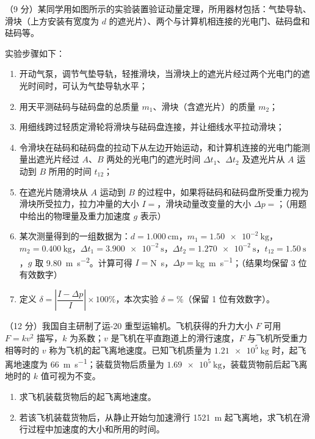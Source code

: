 \begin{question}
（9 分）某同学用如图所示的实验装置验证动量定理，所用器材包括：气垫导轨、滑块（上方安装有宽度为 $d$ 的遮光片）、两个与计算机相连接的光电门、砝码盘和砝码等。


实验步骤如下：
\begin{enumerate}[leftmargin=2em, label=(\arabic*)]
  \item 开动气泵，调节气垫导轨，轻推滑块，当滑块上的遮光片经过两个光电门的遮光时间\gkblank{}时，可认为气垫导轨水平；
  \item 用天平测砝码与砝码盘的总质量 $m_1$、滑块（含遮光片）的质量 $m_2$；
  \item 用细线跨过轻质定滑轮将滑块与砝码盘连接，并让细线水平拉动滑块；
  \item 令滑块在砝码和砝码盘的拉动下从左边开始运动，和计算机连接的光电门能测量出遮光片经过 $A$、$B$ 两处的光电门的遮光时间 $\Delta t_1$、$\Delta t_2$ 及遮光片从 $A$ 运动到 $B$ 所用的时间 $t_{12}$；
  \item 在遮光片随滑块从 $A$ 运动到 $B$ 的过程中，如果将砝码和砝码盘所受重力视为滑块所受拉力，拉力冲量的大小 $I=$\gkblank，滑块动量改变量的大小 $\Delta p=$\gkblank；（用题中给出的物理量及重力加速度 $g$ 表示）
  \item 某次测量得到的一组数据为：$d=\SI{1.000}{\centi\metre}$，$m_1=\SI{1.50e-2}{\kilogram}$，$m_2=\SI{0.400}{\kilogram}$，$\Delta t_1=\SI{3.900e-2}{\second}$，$\Delta t_2=\SI{1.270e-2}{\second}$，$t_{12}=\SI{1.50}{\second}$，$g$ 取 \SI{9.80}{\metre\per\second\squared}。计算可得 $I=$\gkblank\si{\newton\second}，$\Delta p=$\gkblank\si{\kilogram\metre\per\second}；（结果均保留 3 位有效数字）
  \item 定义 $\delta=\left|\dfrac{I-\Delta p}{I}\right|\times100\%$，本次实验 $\delta=$\gkblank\%（保留 1 位有效数字）。
\end{enumerate}
\end{question}

\begin{question}
（12 分）我国自主研制了运-20 重型运输机。飞机获得的升力大小 $F$ 可用 $F=kv^2$ 描写，$k$ 为系数；$v$ 是飞机在平直跑道上的滑行速度，$F$ 与飞机所受重力相等时的 $v$ 称为飞机的起飞离地速度。已知飞机质量为 $\SI{1.21e5}{\kilogram}$ 时，起飞离地速度为 \SI{66}{\metre\per\second}；装载货物后质量为 $\SI{1.69e5}{\kilogram}$，装载货物前后起飞离地时的 $k$ 值可视为不变。

\begin{enumerate}[leftmargin=2em, label=(\arabic*)]
  \item 求飞机装载货物后的起飞离地速度。
  \item 若该飞机装载货物后，从静止开始匀加速滑行 \SI{1521}{\metre} 起飞离地，求飞机在滑行过程中加速度的大小和所用的时间。
\end{enumerate}
\end{question}


